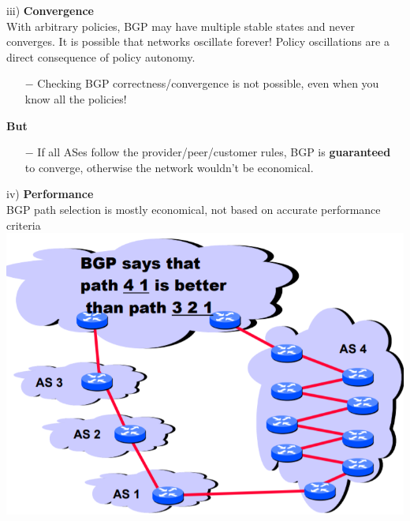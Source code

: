 \documentclass[a4paper, fontsize=8pt, landscape, DIV=1]{scrartcl}
\begin{document}
\begin{multicols*}{4}
		iii) \textbf{Convergence}\\
		With arbitrary policies, BGP may have multiple stable states and never
		converges. It is possible that networks oscillate forever! Policy oscillations
		are a direct consequence of policy autonomy.
		\begin{itemize}[noitemsep]
			\item[$-$] Checking BGP correctness/convergence is not possible, even when
			you know all the policies!
		\end{itemize}
		\textbf{But}
		\begin{itemize}[noitemsep]
			\item[$-$] If all ASes follow the provider/peer/customer rules, BGP is
			\textbf{guaranteed} to converge, otherwise the network wouldn't be economical. 
		\end{itemize}
		\par 
		iv) \textbf{Performance}\\
		BGP path selection is mostly economical, not based on accurate performance
		criteria
		\includegraphics[width=\columnwidth]{images/Network_Layer/BGP_performance.png}
		\par 
		

\end{multicols*}
\end{document}
